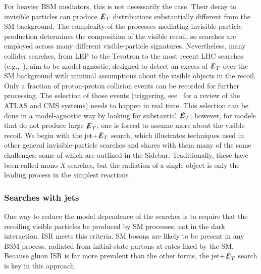 \documentclass{ar-1col}
\newcommand{\IP}{invisible particle}
\newcommand{\MET}{\ensuremath{\slashed{E}_T}\xspace}
\begin{document}
For heavier BSM mediators, this is not necessarily the case. Their
decay to {\IP}s can produce \MET distributions substantially
different from the SM background. The complexity of the processes
mediating invisible-particle production determines the composition
of the visible recoil, so searches are employed across many
different visible-particle signatures. Nevertheless, many collider
searches, from LEP to the Tevatron to the most recent LHC searches
(e.g.,~), aim to be model agnostic,
designed to detect an excess of \MET over the SM background with
minimal assumptions about the visible objects in the recoil.
Only a fraction of proton-proton collision events can be recorded for
further processing. The selection of those events (triggering, see~
for a review of the ATLAS and CMS systems)
needs to happen in real time. This selection can be done in a model-agnostic way by looking
for substantial \MET; however, for models that do not
produce large \MET, one is forced to assume more about the visible
recoil. We begin with the jet+\MET search, which illustrates
techniques used in other general invisible-particle searches and
shares with them many of the same challenges, some of which are outlined in the Sidebar.
Traditionally, these
have been called mono-\textit{X} searches, but the radiation of a single
object is only the leading process in the simplest
reactions~\cite{Haisch:2013ata}.

\subsubsection{Searches with jets}\label{sub:monojet}

One way to reduce the model dependence of the searches is to
require that the recoiling visible particles be produced by SM
processes, not in the dark interaction. ISR meets this criteria.
SM bosons are likely to be present in any BSM process, radiated
from initial-state partons at rates fixed by the SM. Because gluon
ISR is far more prevalent than the other forms, the jet+\MET
search is key in this approach.
\end{document}
